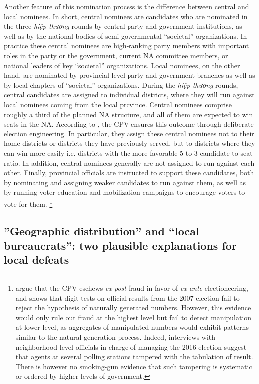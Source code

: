\documentclass[12pt]{article}\usepackage[]{graphicx}\usepackage[]{color}
\newcommand{\1}{\mathbbm{1}}
\begin{document}
Another feature of this nomination process is the difference between central and local nominees. In short, central nominees are candidates who are nominated in the three \textit{hiệp thương} rounds by central party and government institutions, as well as by the national bodies of semi-governmental ``societal'' organizations. In practice these central nominees are high-ranking party members with important roles in the party or the government, current NA committee members, or national leaders of key ``societal'' organizations. Local nominees, on the other hand, are nominated by provincial level party and government branches as well as by local chapters of ``societal'' organizations. During the \textit{hiệp thương} rounds, central candidates are assigned to individual districts, where they will run against local nominees coming from the local province. Central nominees comprise roughly a third of the planned NA structure, and all of them are expected to win seats in the NA. According to \cite{MaleskySchuler2011}, the CPV ensures this outcome  through deliberate election engineering. In particular, they assign these central nominees not to their home districts or districts they have previously served, but to districts where they can win more easily i.e. districts with the more favorable 5-to-3 candidate-to-seat ratio. In addition,  central nominees generally are not assigned to run against each other. Finally, provincial officials are instructed to support these candidates, both by nominating and assigning  weaker candidates to run against them, as well as by running voter education and mobilization campaigns to encourage voters to vote for them. \footnote{\cite{MaleskySchuler2011} argue that the CPV eschews \textit{ex post} fraud in favor of \textit{ex ante} electioneering, and shows that digit tests on official results from the 2007 election fail to reject the hypothesis of naturally generated numbers. However, this evidence would only rule out fraud at the highest level but fail to detect manipulation at lower level, as aggregates of manipulated numbers would exhibit patterns similar to the natural generation process. Indeed, interviews with neighborhood-level officials in charge of managing the 2016 election suggest that agents at several polling stations tampered with the tabulation of result. There is however no smoking-gun evidence that such tampering is systematic or ordered by higher levels of government.}

\subsection{''Geographic distribution'' and ``local bureaucrats'': two plausible explanations for local defeats}
\end{document}
